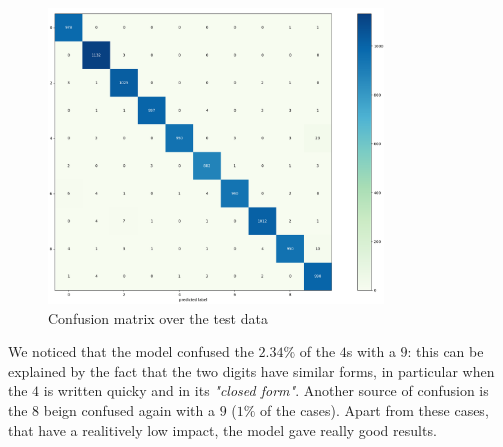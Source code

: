 \documentclass[compsoc]{IEEEtran}
\begin{document}
\begin{figure}[ht!]
\centering                                                                        
\includegraphics[width=3.5in]{cm2.png}
\captionsetup{justification=centering}                                                                                         
\caption{Confusion matrix over the test data}
\label{fig:cm}                                                                                                                               
\end{figure}

We noticed that the model confused the $2.34\%$ of the $4$s with a $9$: this can be explained by the fact that the two digits have similar forms, in particular when
the $4$ is written quicky and in its \emph{"closed form"}. Another source of confusion is the $8$ beign confused again with a $9$ ($1\%$ of the cases). Apart from these cases, that have a realitively low impact, the model gave really good results.
\end{document}
